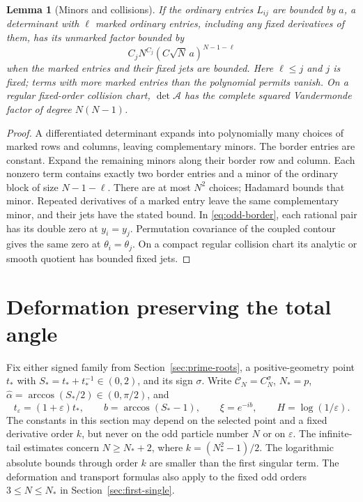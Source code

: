 \documentclass[11pt]{article}
\numberwithin{equation}{section}
\newtheorem{lemma}[theorem]{Lemma}
\theoremstyle{remark}\newtheorem{remark}[theorem]{Remark}
\begin{document}
\begin{lemma}[Minors and collisions]\label{lem:border-minors}
If the ordinary entries $L_{ij}$ are bounded by $a$, a determinant
with $\ell$ marked ordinary entries, including any fixed derivatives
of them, has its unmarked factor bounded by
\[
 C_j N^{C_j}(C\sqrt N\,a)^{N-1-\ell}
\]
when the marked entries and their fixed jets are bounded.
Here $\ell\le j$ and $j$ is fixed; terms with more marked entries
than the polynomial permits vanish.
On a regular fixed-order collision chart, $\det\mathcal A$
has the complete squared Vandermonde factor of degree $N(N-1)$.
\end{lemma}
\begin{proof}
A differentiated determinant expands into polynomially many
choices of marked rows and columns, leaving complementary minors.
The border entries are constant. Expand the remaining minors along
their border row and column.
Each nonzero term contains exactly two border entries and a minor
of the ordinary block of size $N-1-\ell$.
There are at most $N^2$ choices; Hadamard bounds that minor.
Repeated derivatives of a marked entry leave the same complementary
minor, and their jets have the stated bound. In \eqref{eq:odd-border},
each rational pair has its double zero at $y_i=y_j$.
Permutation covariance of the coupled contour gives the same
zero at $\theta_i=\theta_j$. On a compact regular collision
chart its analytic or smooth quotient has bounded fixed jets.
\end{proof}
\section{Deformation preserving the total angle}
\label{sec:constrained-deformation}

Fix either signed family from Section~\ref{sec:prime-roots},
a positive-geometry point $t_*$ with $S_*=t_*+t_*^{-1}\in(0,2)$,
and its sign $\sigma$. Write $\mathcal C_N=C_N^\sigma$,
$N_*=p$, $\widehat\alpha=\arccos(S_*/2)\in(0,\pi/2)$, and
\[
 t_\varepsilon=(1+\varepsilon)t_*,\qquad
 b=\arccos(S_*-1),\qquad \xi=e^{-ib},\qquad
 H=\log(1/\varepsilon).
\]
The constants in this section may depend on the selected point and a
fixed derivative order $k$, but never on the odd particle number $N$
or on $\varepsilon$.  The infinite-tail estimates concern $N\ge N_*+2$, where
$k=(N_*^2-1)/2$.
The logarithmic absolute bounds through order $k$ are smaller than
the first singular term. The deformation and transport formulas
also apply to the fixed odd orders $3\le N\le N_*$ in
Section~\ref{sec:first-single}.
\end{document}
